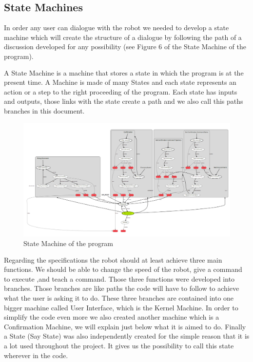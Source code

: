 \subsection{State Machines}

In order any user can dialogue with the robot we needed to develop a state machine which will create the structure of a dialogue by following the path of a discussion developed for any possibility (see Figure 6 of the State Machine of the program).

A State Machine is a machine that stores a state in which the program is at the present time. A Machine is made of many States and each state represents an action or a step to the right proceeding of the program. Each state has inputs and outputs, those links with the state create a path and we also call this paths branches in this document.

 \begin{figure}
 \center
 \includegraphics[width=15cm]{img_SM/StateMachine.png}
 \caption{State Machine of the program}
 \end{figure}

Regarding the specifications the robot should at least achieve three main functions. We should be able to change the speed of the robot, give a command to execute ,and teach a command. Those three functions were developed into branches. Those branches are like paths the code will have to follow to achieve what the user is asking it to do. These three branches are contained into one bigger machine called User Interface, which is the Kernel Machine. In order to simplify the code even more we also created another machine which is a Confirmation Machine, we will explain just below what it is aimed to do. Finally a State (Say State) was also independently created for the simple reason that it is a lot used throughout the project. It gives us the possibility to call this state wherever in the code.

